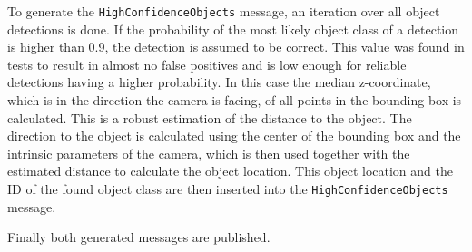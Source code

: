 To generate the \texttt{HighConfidenceObjects} message, an iteration over all object detections is done. If the probability of the most likely object class of a detection is higher than 0.9, the detection is assumed to be correct. This value was found in tests to result in almost no false positives and is low enough for reliable detections having a higher probability. In this case the median z-coordinate, which is in the direction the camera is facing, of all points in the bounding box is calculated. This is a robust estimation of the distance to the object. The direction to the object is calculated using the center of the bounding box and the intrinsic parameters of the camera, which is then used together with the estimated distance to calculate the object location. This object location and the ID of the found object class are then inserted into the \texttt{HighConfidenceObjects} message. 

Finally both generated messages are published.